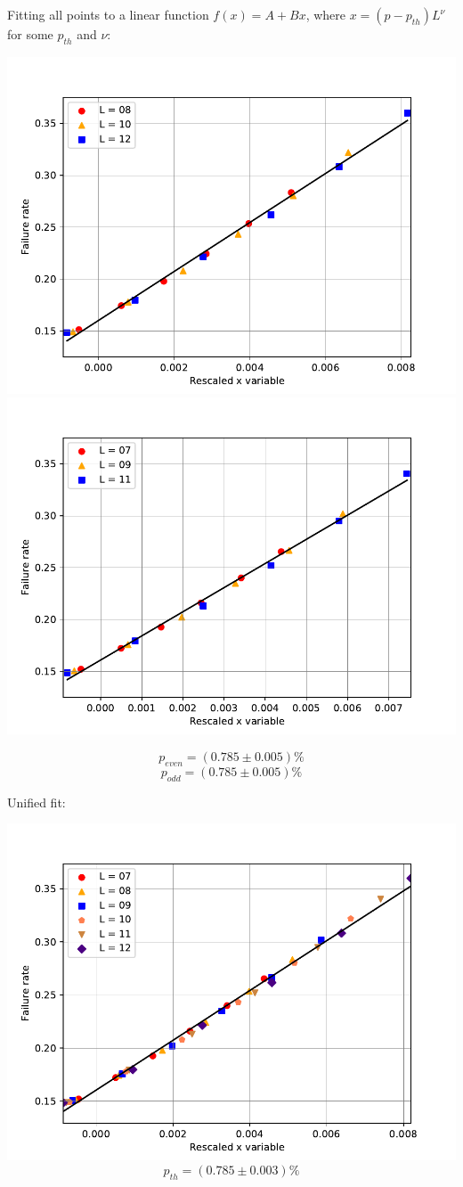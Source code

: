 \documentclass[pra]{revtex4-1}
\begin{document}
\noindent Fitting all points to a linear function $f(x) = A + Bx$, where $x=(p-p_{th})L^{\nu}$ for some $p_{th}$ and $\nu$: 
  
\includegraphics[width=.49\textwidth]{../graphs-paper2/vtx-dephasing-even-rescaled.pdf}
\includegraphics[width=.49\textwidth]{../graphs-paper2/vtx-dephasing-odd-rescaled.pdf}

\[  p_{even} = (0.785 \pm 0.005)\% \]
\[  p_{odd} = (0.785 \pm 0.005)\% \]
\clearpage 

Unified fit: \begin{center} 

\includegraphics[width=.9\textwidth]{../graphs-paper2/vtx-dephasing-rescaled.pdf}
\[  p_{th} = (0.785 \pm 0.003)\% \] \end{center}
\clearpage 
\end{document}
